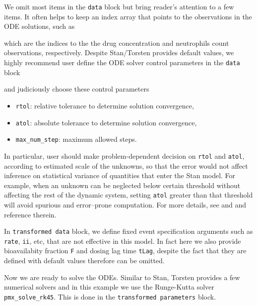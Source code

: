 We omit most items in the \texttt{data} block but bring reader's attention to a
few items. It often helps to keep an index array that points to the
observations in the ODE solutions, such as

which are the indices to the the drug concentration and neutrophils
count observations, respectively. Despite Stan/Torsten provides
default values, we highly recommend user define the ODE
solver control parameters in the \texttt{data} block

and judiciously choose these control parameters
\begin{itemize}
\item \texttt{rtol}: relative tolerance to determine solution convergence,
\item \texttt{atol}: absolute tolerance to determine solution convergence,
\item \texttt{max\_num\_step}: maximum allowed steps.
\end{itemize}
In particular, user should make problem-dependent decision on \texttt{rtol} and \texttt{atol},
according to estimated scale of the unknowns, so that the error would
not affect inference on statistical variance of quantities that enter
the Stan model. For example, when an unknown can be neglected below
certain threshold without affecting the rest of the dynamic system,
setting \texttt{atol} greater than that threshold will avoid spurious and
error--prone computation. For more details, see \cite[Chapter 13]{Stan_users_guide:2021}
and \cite[Section 3.7.5]{Torsten:2021} and reference therein.

In \texttt{transformed data} block, we define fixed event specification
arguments such as \texttt{rate}, \texttt{ii}, etc, that are not
effective in this model. In fact here we also provide bioavailabity fraction \texttt{F} and dosing lag
time \texttt{tLag}, despite the fact that they are defined with default values
therefore can be omitted.


Now we are ready to solve the ODEs. Similar to Stan, Torsten provides
a few numerical solvers and in this
example we use the Runge-Kutta solver
\texttt{pmx\_solve\_rk45}\cite[Section 3.4]{Torsten:2021}. This
is done in the \texttt{transformed parameters} block.



